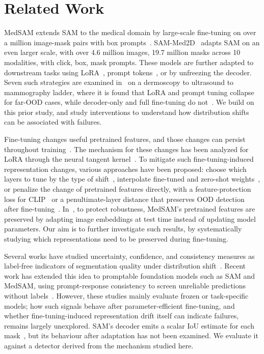 \documentclass[runningheads]{llncs}
\begin{document}
\section{Related Work}
\label{sec:related}

MedSAM extends SAM to the medical domain by large-scale fine-tuning on over a million image-mask pairs with box prompts~\cite{ma2024medsam}. SAM-Med2D~\cite{cheng2023sammed2d} adapts SAM on an even larger scale, with over 4.6 million images, 19.7 million masks across 10 modalities, with click, box, mask prompts. These models are further adapted to downstream tasks using LoRA~\cite{hu2022lora}, prompt tokens~\cite{jia2022vpt}, or by unfreezing the decoder. Seven such strategies are examined in~\cite{prior2026safer} on a dermoscopy to ultrasound to mammography ladder, where it is found that LoRA and prompt tuning collapse for far-OOD cases, while decoder-only and full fine-tuning do not~\cite{prior2026safer}. We build on this prior study, and study interventions to understand how distribution shifts can be associated with failures.

Fine-tuning changes useful pretrained features, and those changes can persist throughout training~\cite{kumar2022finetuning}. The mechanism for these changes has been analyzed for LoRA through the neural tangent kernel~\cite{tomihari2024ntk}. To mitigate such fine-tuning-induced representation changes, various approaches have been proposed: choose which layers to tune by the type of shift~\cite{lee2023surgical}, interpolate fine-tuned and zero-shot weights~\cite{wortsman2022wiseft}, or penalize the change of pretrained features directly, with a feature-protection loss for CLIP~\cite{tan2024protection} or a penultimate-layer distance that preserves OOD detection after fine-tuning~\cite{zhang2025oodreg}. In~\cite{chen2025tta}, to protect robustness, MedSAM's pretrained features are preserved by adapting image embeddings at test time instead of updating model parameters. Our aim is to further investigate such results, by systematically studying which representations need to be preserved during fine-tuning.

Several works have studied uncertainty, confidence, and consistency measures as label-free indicators of segmentation quality under distribution shift~\cite{zenk2024failure}. Recent work has extended this idea to promptable foundation models such as SAM and MedSAM, using prompt-response consistency to screen unreliable predictions without labels~\cite{kinalioglu2026consistency}. However, these studies mainly evaluate frozen or task-specific models; how such signals behave after parameter-efficient fine-tuning, and whether fine-tuning-induced representation drift itself can indicate failures, remains largely unexplored. SAM's decoder emits a scalar IoU estimate for each mask~\cite{kirillov2023sam}, but its behaviour after adaptation has not been examined. We evaluate it against a detector derived from the mechanism studied here.
\end{document}
